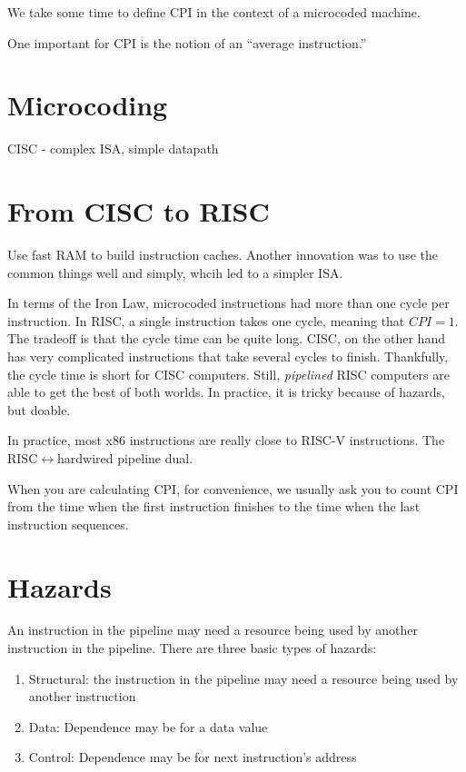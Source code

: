 \setcounter{section}{0}

We take some time to define CPI in the context of a microcoded machine.

One important for CPI is the notion of an ``average instruction.''

\section{Microcoding}
CISC - complex ISA, simple datapath


\section{From CISC to RISC}
Use fast RAM to build instruction caches.
Another innovation was to use the common things well and simply, whcih led to a simpler ISA.



In terms of the Iron Law, microcoded instructions had more than one cycle per instruction.
In RISC, a single instruction takes one cycle, meaning that $CPI = 1$.
The tradeoff is that the cycle time can be quite long.
CISC, on the other hand has very complicated instructions that take several cycles to finish.
Thankfully, the cycle time is short for CISC computers.
Still, \textit{pipelined} RISC computers are able to get the best of both worlds.
In practice, it is tricky because of hazards, but doable.


In practice, most x86 instructions are really close to RISC-V instructions.
The RISC$\leftrightarrow$hardwired pipeline dual.

When you are calculating CPI, for convenience, we usually ask you to count CPI from the time when the first instruction finishes to the time when the last instruction sequences.

\section{Hazards}
An instruction in the pipeline may need a resource being used by another instruction in the pipeline.
There are three basic types of hazards:
\begin{enumerate}
    \item Structural: the instruction in the pipeline may need a resource being used by another instruction
    \item Data: Dependence may be for a data value
    \item Control: Dependence may be for next instruction's address
\end{enumerate}

